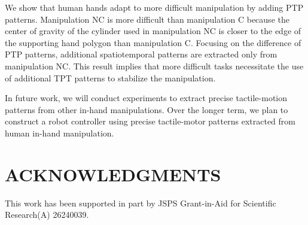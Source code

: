 \documentclass[letterpaper, 10 pt, conference]{IEEEtran}  %
\begin{document}
We show that human hands adapt to more difficult manipulation by adding PTP patterns. Manipulation NC is more difficult than manipulation C because the center of gravity of the cylinder used in manipulation NC is closer to the edge of the supporting hand polygon than manipulation C. Focusing on the difference of PTP patterns, additional spatiotemporal patterns are extracted only from manipulation NC. This result implies that more difficult tasks necessitate the use of additional TPT patterns to stabilize the manipulation.

In future work, we will conduct experiments to extract precise tactile-motion patterns from other in-hand manipulations. Over the longer term, we plan to construct a robot controller using precise tactile-motor patterns extracted from human in-hand manipulation.
\addtolength{\textheight}{-12cm}   %


\section*{ACKNOWLEDGMENTS}
This work has been supported in part by JSPS Grant-in-Aid for Scientific Research(A) 26240039.






%

\end{document}
